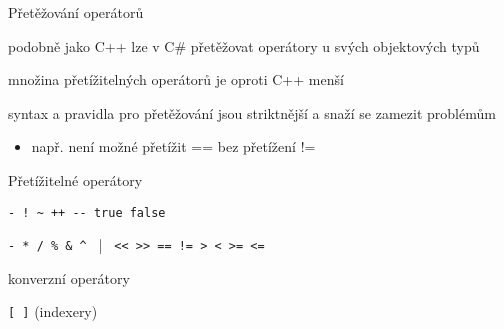 
\begin{frame}[fragile]
\vfill
\begin{bitemize}{Přetěžování operátorů}
\item podobně jako C++ lze v C\# přetěžovat operátory u svých objektových typů
\item množina přetížitelných operátorů je oproti C++ menší
\item syntax a pravidla pro přetěžování jsou striktnější a snaží se zamezit problémům
\begin{itemize}
\item např. není možné přetížit == bez přetížení !=
\end{itemize}

\end{bitemize}
\vfill
\begin{bitemize}{Přetížitelné operátory}
\item \lstinline|- ! ~ ++ -- true false|
\item \lstinline|- * / % & ^ | | \lstinline| << >> == != > < >= <=|
\item konverzní operátory
\item \lstinline|[ ]| (indexery)
\end{bitemize}
\vfill
\end{frame}


\nezkouskove

